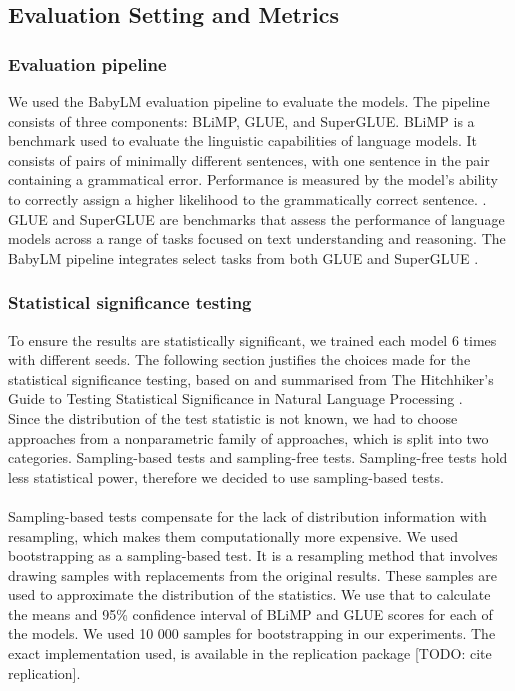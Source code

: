 \subsection{Evaluation Setting and Metrics}
\subsubsection{Evaluation pipeline\protect\footnotemark[4] \protect\footnotemark[5]}
We used the BabyLM evaluation pipeline \cite{Warstadt2023} to evaluate the models. The pipeline consists of three components: BLiMP, GLUE, and SuperGLUE. BLiMP is a benchmark used to evaluate the linguistic capabilities of language models. It consists of pairs of minimally different sentences, with one sentence in the pair containing a grammatical error. Performance is measured by the model's ability to correctly assign a higher likelihood to the grammatically correct sentence. \cite{Warstadt2023blimp} \cite{warstadt-etal-2023-findings}. GLUE and SuperGLUE are benchmarks that assess the performance of language models across a range of tasks focused on text understanding and reasoning. The BabyLM pipeline integrates select tasks from both GLUE and SuperGLUE \cite{Wang2019} \cite{Wang2020}.

\subsubsection{Statistical significance testing}
To ensure the results are statistically significant, we trained each model 6 times with different seeds. The following section justifies the choices made for the statistical significance testing, based on and summarised from The Hitchhiker’s Guide to Testing Statistical Significance in Natural Language Processing \cite{dror2018hitchhikers}. \\
Since the distribution of the test statistic is not known, we had to choose approaches from a nonparametric family of approaches, which is split into two categories. Sampling-based tests and sampling-free tests. Sampling-free tests hold less statistical power, therefore we decided to use sampling-based tests.
\\\\
Sampling-based tests compensate for the lack of distribution information with resampling, which makes them computationally more expensive. We used bootstrapping as a sampling-based test. It is a resampling method that involves drawing samples with replacements from the original results. These samples are used to approximate the distribution of the statistics. We use that to calculate the means and 95\% confidence interval of BLiMP and GLUE scores for each of the models. We used 10 000 samples for bootstrapping in our experiments. The exact implementation used, is available in the replication package [TODO: cite replication].

